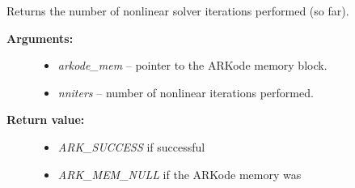 \documentclass[letterpaper,10pt,english]{sphinxmanual}
\begin{document}

\begin{fulllineitems}
\label{c_interface/User_callable:c.ARKodeGetNumNonlinSolvIters}
Returns the number of nonlinear solver iterations
performed (so far).
\begin{description}
\item[{\textbf{Arguments:}}] \leavevmode\begin{itemize}
\item {} 
\emph{arkode\_mem} -- pointer to the ARKode memory block.

\item {} 
\emph{nniters} -- number of nonlinear iterations performed.

\end{itemize}

\item[{\textbf{Return value:}}] \leavevmode\begin{itemize}
\item {} 
\emph{ARK\_SUCCESS} if successful

\item {} 
\emph{ARK\_MEM\_NULL} if the ARKode memory was 

\end{itemize}

\end{description}

\end{fulllineitems}

\end{document}
